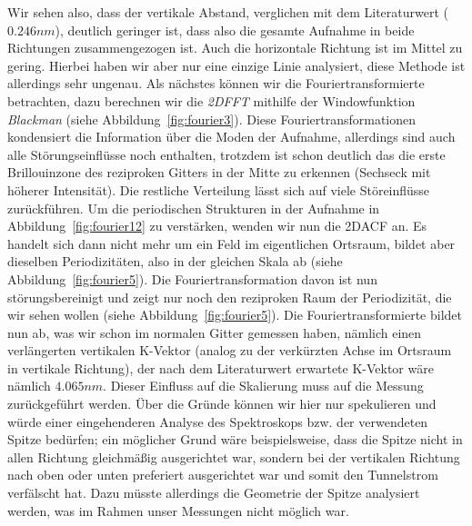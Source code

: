 Wir sehen also, dass der vertikale Abstand, verglichen mit dem Literaturwert ($0.246nm$), deutlich
geringer ist, dass also die gesamte Aufnahme in beide Richtungen zusammengezogen ist. 
Auch die horizontale Richtung ist im Mittel zu gering. Hierbei haben wir aber nur eine einzige
Linie analysiert, diese Methode ist allerdings sehr ungenau. 
Als nächstes können wir die Fouriertransformierte betrachten, dazu
berechnen wir die \textit{2DFFT} mithilfe der Windowfunktion \textit{Blackman} 
(siehe Abbildung~\ref{fig:fourier3}). Diese Fouriertransformationen kondensiert die Information
über die Moden der Aufnahme, allerdings sind auch alle Störungseinflüsse noch enthalten, trotzdem
ist schon deutlich das die erste Brillouinzone des reziproken Gitters in der Mitte zu erkennen
(Sechseck mit höherer Intensität). Die restliche Verteilung lässt sich auf viele Störeinflüsse
zurückführen. Um die periodischen Strukturen in der Aufnahme in Abbildung~\ref{fig:fourier12} zu
verstärken, wenden wir nun die 2DACF an. Es handelt sich dann nicht mehr um ein Feld im 
eigentlichen Ortsraum, bildet aber dieselben Periodizitäten, also in der gleichen Skala ab
(siehe Abbildung~\ref{fig:fourier5}). Die Fouriertransformation davon ist nun störungsbereinigt
und zeigt nur noch den reziproken Raum der Periodizität, die wir sehen wollen
(siehe Abbildung~\ref{fig:fourier5}). Die Fouriertransformierte bildet nun ab, was wir schon
im normalen Gitter gemessen haben, nämlich einen verlängerten vertikalen K-Vektor (analog
zu der verkürzten Achse im Ortsraum in vertikale Richtung), der nach dem Literaturwert 
erwartete K-Vektor wäre nämlich $4.065nm$. Dieser Einfluss auf die Skalierung
muss auf die Messung zurückgeführt werden. Über die Gründe können wir hier nur spekulieren und 
würde einer eingehenderen Analyse des Spektroskops bzw. der verwendeten Spitze bedürfen; 
ein möglicher Grund wäre beispielsweise, dass die Spitze nicht in allen Richtung gleichmäßig 
ausgerichtet war, sondern bei der vertikalen Richtung nach oben oder unten preferiert ausgerichtet
war und somit den Tunnelstrom verfälscht hat. Dazu müsste allerdings die Geometrie der Spitze 
analysiert werden, was im Rahmen unser Messungen nicht möglich war.
